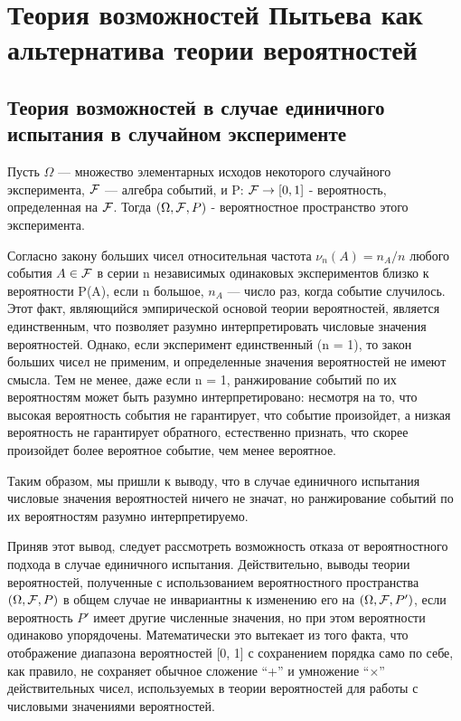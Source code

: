 \documentclass[a4paper, 14pt]{extarticle}
\begin{document}
\section{Теория возможностей Пытьева как альтернатива теории вероятностей} 
\subsection{Теория возможностей в случае единичного испытания в случайном эксперименте} \label{11}
Пусть $\Omega$ --- множество элементарных исходов некоторого случайного эксперимента, ${\cal F}$ --- алгебра событий, и P: ${\cal F} \rightarrow [0, 1]$ - вероятность, определенная на ${\cal F}$. Тогда $(\Omega, {\cal F}, P)$ - вероятностное пространство этого эксперимента.

Согласно закону больших чисел относительная частота $\nu_n(A) = n_A/n$ любого события $A \in {\cal F}$ в серии n независимых одинаковых экспериментов близко к вероятности P(A), если n большое, $n_A$ --- число раз, когда событие случилось. Этот факт, являющийся эмпирической основой теории вероятностей, является единственным, что позволяет разумно интерпретировать числовые значения вероятностей. Однако, если эксперимент единственный (n = 1), то закон больших чисел не применим, и определенные значения вероятностей не имеют смысла. Тем не менее, даже если n = 1, ранжирование событий по их вероятностям может быть разумно интерпретировано: несмотря на то, что высокая вероятность события не гарантирует, что событие произойдет, а низкая вероятность не гарантирует обратного, естественно признать, что скорее произойдет более вероятное событие, чем менее вероятное.

Таким образом, мы пришли к выводу, что в случае единичного испытания числовые значения вероятностей ничего не значат, но ранжирование событий по их вероятностям разумно интерпретируемо.

Приняв этот вывод, следует рассмотреть возможность отказа от вероятностного подхода в случае единичного испытания. Действительно, выводы теории вероятностей, полученные с использованием вероятностного пространства $(\Omega, {\cal F}, P)$ в общем случае не инвариантны к изменению его на $(\Omega, {\cal F}, P')$, если вероятность $P'$ имеет другие численные значения, но при этом вероятности одинаково упорядочены. Математически это вытекает из того факта, что отображение диапазона вероятностей [0, 1] с сохранением порядка само по себе, как правило, не сохраняет обычное сложение “+” и умножение “×” действительных чисел, используемых в теории вероятностей для работы с числовыми значениями вероятностей.
\end{document}
